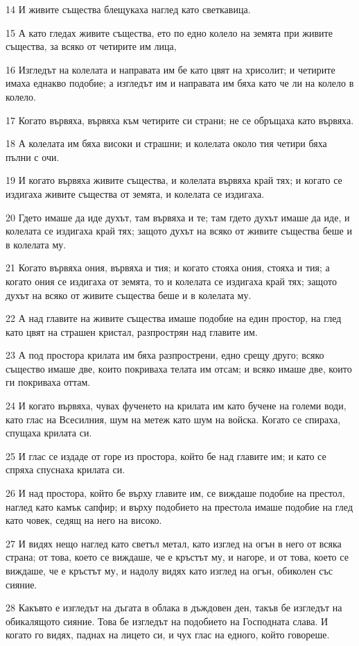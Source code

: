 \par 14 И живите същества блещукаха наглед като светкавица.
\par 15 А като гледах живите същества, ето по едно колело на земята при живите същества, за всяко от четирите им лица,
\par 16 Изгледът на колелата и направата им бе като цвят на хрисолит; и четирите имаха еднакво подобие; а изгледът им и направата им бяха като че ли на колело в колело.
\par 17 Когато вървяха, вървяха към четирите си страни; не се обръщаха като вървяха.
\par 18 А колелата им бяха високи и страшни; и колелата около тия четири бяха пълни с очи.
\par 19 И когато вървяха живите същества, и колелата вървяха край тях; и когато се издигаха живите същества от земята, и колелата се издигаха.
\par 20 Гдето имаше да иде духът, там вървяха и те; там гдето духът имаше да иде, и колелата се издигаха край тях; защото духът на всяко от живите същества беше и в колелата му.
\par 21 Когато вървяха ония, вървяха и тия; и когато стояха ония, стояха и тия; а когато ония се издигаха от земята, то и колелата се издигаха край тях; защото духът на всяко от живите същества беше и в колелата му.
\par 22 А над главите на живите същества имаше подобие на един простор, на глед като цвят на страшен кристал, разпрострян над главите им.
\par 23 А под простора крилата им бяха разпрострени, едно срещу друго; всяко същество имаше две, които покриваха телата им отсам; и всяко имаше две, които ги покриваха оттам.
\par 24 И когато вървяха, чувах фученето на крилата им като бучене на големи води, като глас на Всесилния, шум на метеж като шум на войска. Когато се спираха, спущаха крилата си.
\par 25 И глас се издаде от горе из простора, който бе над главите им; и като се спряха спуснаха крилата си.
\par 26 И над простора, който бе върху главите им, се виждаше подобие на престол, наглед като камък сапфир; и върху подобието на престола имаше подобие на глед като човек, седящ на него на високо.
\par 27 И видях нещо наглед като светъл метал, като изглед на огън в него от всяка страна; от това, което се виждаше, че е кръстът му, и нагоре, и от това, което се виждаше, че е кръстът му, и надолу видях като изглед на огън, обиколен със сияние.
\par 28 Какъвто е изгледът на дъгата в облака в дъждовен ден, такъв бе изгледът на обикалящото сияние. Това бе изгледът на подобието на Господната слава. И когато го видях, паднах на лицето си, и чух глас на едного, който говореше.

